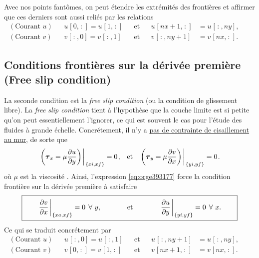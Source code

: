 \documentclass[10pt]{report}
\numberwithin{equation}{section}
\newcommand{\venti}{\vphantom{\sum_x^x}}
\newcommand{\pt}{\hspace{1pt}} %
\begin{document}
Avec nos points fantômes, on peut étendre les extrémités des frontières et affirmer que ces derniers sont aussi reliés par les relations
\begin{subequations}
\begin{align}
(\text{Courant }u) &&  u\pt[0,\pt:\pt] = u\pt[1,\pt:\pt] && \text{et} && u\pt[nx+1,\pt:\pt] &= u\pt[\pt:\pt,ny],&&\\
(\text{Courant }v) &&  v\pt[\pt:\pt,0] = v\pt[\pt:\pt,1] && \text{et} && v\pt[\pt:\pt,ny+1] &= v\pt[nx,\pt:\pt].&&
\end{align}
\end{subequations}
\subsection{Conditions frontières sur la dérivée première (Free slip condition)}
\label{sec:org8f660d2}

La seconde condition est la \emph{free slip condition} (ou la condition de glissement libre).
La \emph{free slip condition} tient à l'hypothèse que la couche limite est si petite qu'on peut essentiellement l'ignorer, ce qui est souvent le cas pour l'étude des fluides à grande échelle.
Concrétement, il n'y a \href{https://physics.stackexchange.com/questions/383096/understanding-free-slip-boundary-condition\#:\~:text=On\%20the\%20other\%20hand\%2C\%20the,the\%20tangential\%20component\%20is\%20unrestricted.}{pas de contrainte de cisaillement au mur}, de sorte que
\begin{align}
\label{eq:orge393177}
&&\eval{\qty(\boldsymbol{\tau}_x = \mu \pdv{u}{y})\pt }_{\pt\{xi,xf\}} = 0\pt, && \text{et} &&
  \eval{\qty(\boldsymbol{\tau}_y = \mu \pdv{v}{x})\pt }_{\pt\{yi,yf\}} = 0\pt. &&
\end{align}
où \(\mu\) est la viscosité \autocite{tan2018applying}.
Ainsi, l'expression \ref{eq:orge393177} force la condition frontière sur la dérivée première à satisfaire 
\begin{equation}
\boxed{\hspace{0.7cm}\eval{\pdv{v}{x}\pt }_{\pt\{xa,xf\}} = 0\pt\ \forall\ y,\hspace{1.3cm} \text{et} \hspace{1.3cm} \eval{\pdv{u}{y}\pt }_{\pt \{yi,yf\}} = 0\pt\ \forall\ x.\hspace{0.7cm}\venti}
\end{equation}
Ce qui se traduit concrétement par
\begin{subequations}
\begin{align}
(\text{Courant }u) &&  u\pt[\pt:\pt,0] = u\pt[\pt:\pt,1] && \text{et} && u\pt[\pt:\pt,ny+1] &= u\pt[\pt:\pt,ny],&&\\
(\text{Courant }v) &&  v\pt[0,\pt:\pt] = v\pt[1,\pt:\pt] && \text{et} && v\pt[nx+1,\pt:\pt] &= v\pt[nx,\pt:\pt].&&
\end{align}
\end{subequations}
\end{document}
